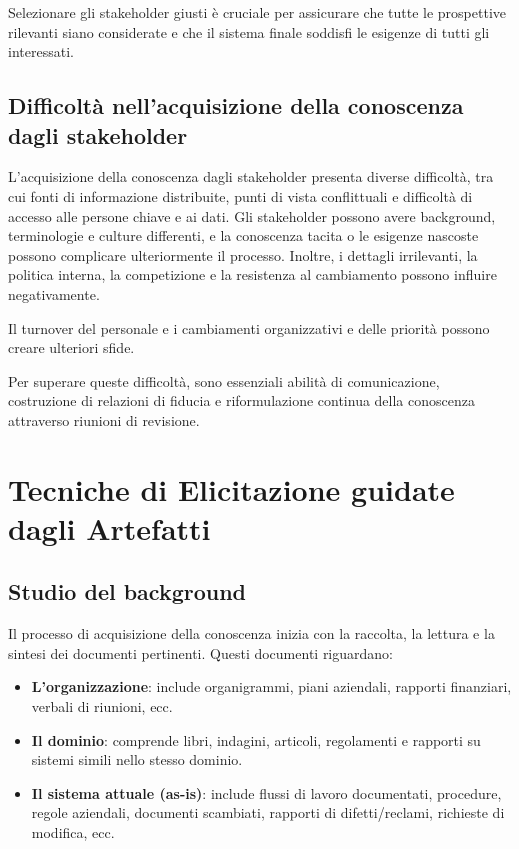 Selezionare gli stakeholder giusti è cruciale per assicurare che tutte le
prospettive rilevanti siano considerate e che il sistema finale soddisfi le
esigenze di tutti gli interessati.

\subsection{Difficoltà nell'acquisizione della conoscenza dagli stakeholder}

L'acquisizione della conoscenza dagli stakeholder presenta diverse difficoltà,
tra cui fonti di informazione distribuite, punti di vista conflittuali e
difficoltà di accesso alle persone chiave e ai dati. Gli stakeholder possono
avere background, terminologie e culture differenti, e la conoscenza tacita o
le esigenze nascoste possono complicare ulteriormente il processo. Inoltre,
i dettagli irrilevanti, la politica interna, la competizione e la resistenza
al cambiamento possono influire negativamente.

Il turnover del personale e i cambiamenti organizzativi e delle priorità
possono creare ulteriori sfide. 

Per superare queste difficoltà, sono essenziali abilità di comunicazione,
costruzione di relazioni di fiducia e riformulazione continua della conoscenza
attraverso riunioni di revisione.
\section{Tecniche di Elicitazione guidate dagli Artefatti}
\subsection{Studio del background}

Il processo di acquisizione della conoscenza inizia con la raccolta, la
lettura e la sintesi dei documenti pertinenti. Questi documenti riguardano:

\begin{itemize}
    \item \textbf{L'organizzazione}: include organigrammi, piani aziendali, 
    rapporti finanziari, verbali di riunioni, ecc.
    \item \textbf{Il dominio}: comprende libri, indagini, articoli, regolamenti
    e rapporti su sistemi simili nello stesso dominio.
    \item \textbf{Il sistema attuale (as-is)}: include flussi di lavoro
    documentati, procedure, regole aziendali, documenti scambiati, rapporti
    di difetti/reclami, richieste di modifica, ecc.
\end{itemize}

